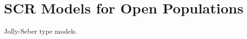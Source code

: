 \chapter{SCR Models for Open Populations}
\label{chapt.open}

\vspace{0.3cm}



Jolly-Seber type models. 

